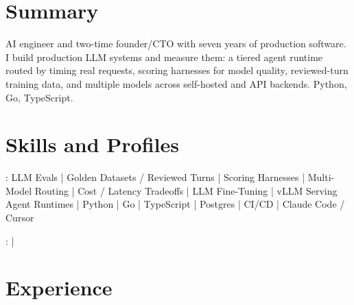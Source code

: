 \documentclass[print]{jack-resume}
\begin{document}
\pagecolor{darkmodeBackground}


\begin{minipage}[t][1cm][t]{.03\textwidth}
    \hfill
\end{minipage}

\section{Summary}
AI engineer and two-time founder/CTO with seven years of production software. I build production LLM systems and measure them: a tiered agent runtime routed by timing real requests, scoring harnesses for model quality, reviewed-turn training data, and multiple models across self-hosted and API backends. Python, Go, TypeScript.
\sectionsep

\section{Skills and Profiles}
:
LLM Evals \hfill | \hfill
Golden Datasets / Reviewed Turns \hfill | \hfill
Scoring Harnesses \hfill | \hfill
Multi-Model Routing \hfill | \hfill
Cost / Latency Tradeoffs \hfill | \hfill
LLM Fine-Tuning \hfill | \hfill
vLLM Serving \\
\hspace{1.0cm} Agent Runtimes \hfill | \hfill
Python \hfill | \hfill
Go \hfill | \hfill
TypeScript \hfill | \hfill
Postgres \hfill | \hfill
CI/CD \hfill | \hfill
Claude Code / Cursor \\

\raggedright{
    :
      \href{https://www.linkedin.com/in/jack-sturtevant/}{ \ExternalLink} |
     \href{https://github.com/jacksturt}{ \ExternalLink}}

\section{Experience}
\end{document}
